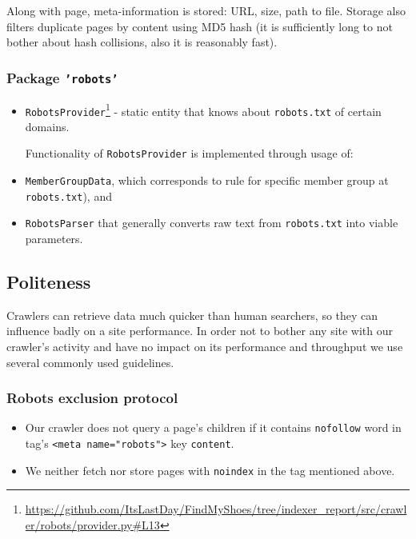     Along with page, meta-information is stored: URL, size, path to file. Storage also filters duplicate pages by content using MD5 hash (it is sufficiently long to not bother about hash collisions, also it is reasonably fast).
    
    \subsubsection{Package \texttt{'robots'}}
    \begin{itemize}
    \item \texttt{RobotsProvider}\footnote{\url{https://github.com/ItsLastDay/FindMyShoes/tree/indexer_report/src/crawler/robots/provider.py\#L13}} - static entity that knows about \newline \texttt{robots.txt} of certain domains. 
    
    Functionality of \texttt{RobotsProvider} is implemented \newline through usage of:
    \item \texttt{MemberGroupData}, which corresponds to rule for specific member group at \texttt{robots.txt}), and 
    \item \texttt{RobotsParser} that generally converts raw text from \texttt{robots.txt} into viable parameters.
    \end{itemize}

\subsection{Politeness}
Crawlers can retrieve data much quicker than human searchers, so they can influence badly on a site performance.
In order not to bother any site with our crawler's activity and have no impact on its performance and throughput we use several commonly used guidelines.

\subsubsection{Robots exclusion protocol}
\begin{itemize}
\item Our crawler does not query a page's children if it contains \texttt{nofollow} word in tag's \texttt{<meta name="robots">} key \texttt{content}.
\item We neither fetch nor store pages with \texttt{noindex} in the tag mentioned above.
\end{itemize}

